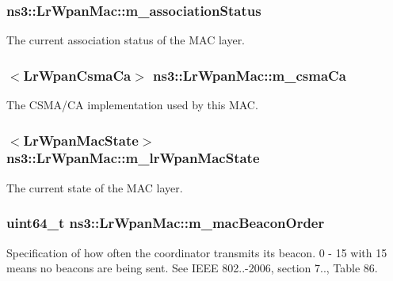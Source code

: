 \subsubsection[{\texorpdfstring{m\+\_\+association\+Status}{m_associationStatus}}]{ ns3\+::\+Lr\+Wpan\+Mac\+::m\+\_\+association\+Status\hspace{0.3cm}{\ttfamily [private]}}\hypertarget{classns3_1_1LrWpanMac_a62c6c8e144e58da7b67dbf862b6cd15d}{}\label{classns3_1_1LrWpanMac_a62c6c8e144e58da7b67dbf862b6cd15d}
The current association status of the M\+AC layer. 
\subsubsection[{\texorpdfstring{m\+\_\+csma\+Ca}{m_csmaCa}}]{$<${\bf Lr\+Wpan\+Csma\+Ca}$>$ ns3\+::\+Lr\+Wpan\+Mac\+::m\+\_\+csma\+Ca\hspace{0.3cm}{\ttfamily [private]}}\hypertarget{classns3_1_1LrWpanMac_a03fc5a3a267a984f8ec0ba62ff9da270}{}\label{classns3_1_1LrWpanMac_a03fc5a3a267a984f8ec0ba62ff9da270}
The C\+S\+M\+A/\+CA implementation used by this M\+AC. 
\subsubsection[{\texorpdfstring{m\+\_\+lr\+Wpan\+Mac\+State}{m_lrWpanMacState}}]{$<${\bf Lr\+Wpan\+Mac\+State}$>$ ns3\+::\+Lr\+Wpan\+Mac\+::m\+\_\+lr\+Wpan\+Mac\+State\hspace{0.3cm}{\ttfamily [private]}}\hypertarget{classns3_1_1LrWpanMac_ab5cdfd39de7397d658d300961dab3ed0}{}\label{classns3_1_1LrWpanMac_ab5cdfd39de7397d658d300961dab3ed0}
The current state of the M\+AC layer. 
\subsubsection[{\texorpdfstring{m\+\_\+mac\+Beacon\+Order}{m_macBeaconOrder}}]{\setlength{\rightskip}{0pt plus 5cm}uint64\+\_\+t ns3\+::\+Lr\+Wpan\+Mac\+::m\+\_\+mac\+Beacon\+Order}\hypertarget{classns3_1_1LrWpanMac_a1c5e50a030447b4352c932e9282c4371}{}\label{classns3_1_1LrWpanMac_a1c5e50a030447b4352c932e9282c4371}
Specification of how often the coordinator transmits its beacon. 0 -\/ 15 with 15 means no beacons are being sent. See I\+E\+EE 802..-\/2006, section 7.., Table 86. 
